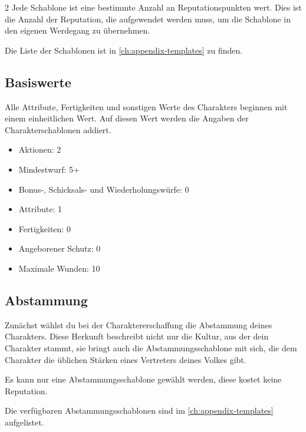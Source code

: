 \begin{multicols}{2}
Jede Schablone ist eine bestimmte Anzahl an Reputationspunkten wert. Dies ist die Anzahl der Reputation, die aufgewendet werden muss, um die Schablone in den eigenen Werdegang zu übernehmen.

Die Liste der Schablonen ist in \cref{ch:appendix-templates} zu finden.

\subsection{Basiswerte}

Alle Attribute, Fertigkeiten und sonstigen Werte des Charakters beginnen mit einem einheitlichen Wert. Auf diesen Wert werden die Angaben der Charakterschablonen addiert.

\begin{itemize}
    \item Aktionen: 2
    \item Mindestwurf: 5+
    \item Bonus-, Schicksals- und Wiederholungswürfe: 0
    \item Attribute: 1
    \item Fertigkeiten: 0
    \item Angeborener Schutz: 0
    \item Maximale Wunden: 10
\end{itemize}

\subsection{Abstammung}

Zunächst wählst du bei der Charaktererschaffung die Abstammung deines Charakters. Diese Herkunft beschreibt nicht nur die Kultur, aus der dein Charakter stammt, sie bringt auch die Abstammungsschablone mit sich, die dem Charakter die üblichen Stärken eines Vertreters deines Volkes gibt.

Es kann nur eine Abstammungsschablone gewählt werden, diese kostet keine Reputation.

Die verfügbaren Abstammungsschablonen sind im \cref{ch:appendix-templates} aufgelistet.


\end{multicols}
